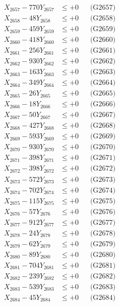 \documentclass[a4paper,10pt]{article}
\begin{document}
{\begin{align}
X_{2657} - 770Y_{2657} &\leq +0 && \text{(G2657)} \\
X_{2658} - 48Y_{2658} &\leq +0 && \text{(G2658)} \\
X_{2659} - 459Y_{2659} &\leq +0 && \text{(G2659)} \\
X_{2660} - 418Y_{2660} &\leq +0 && \text{(G2660)} \\
\allowbreak
X_{2661} - 256Y_{2661} &\leq +0 && \text{(G2661)} \\
X_{2662} - 930Y_{2662} &\leq +0 && \text{(G2662)} \\
X_{2663} - 163Y_{2663} &\leq +0 && \text{(G2663)} \\
X_{2664} - 349Y_{2664} &\leq +0 && \text{(G2664)} \\
X_{2665} - 26Y_{2665} &\leq +0 && \text{(G2665)} \\
X_{2666} - 18Y_{2666} &\leq +0 && \text{(G2666)} \\
X_{2667} - 50Y_{2667} &\leq +0 && \text{(G2667)} \\
X_{2668} - 427Y_{2668} &\leq +0 && \text{(G2668)} \\
X_{2669} - 593Y_{2669} &\leq +0 && \text{(G2669)} \\
X_{2670} - 930Y_{2670} &\leq +0 && \text{(G2670)} \\
\allowbreak
X_{2671} - 398Y_{2671} &\leq +0 && \text{(G2671)} \\
X_{2672} - 398Y_{2672} &\leq +0 && \text{(G2672)} \\
X_{2673} - 572Y_{2673} &\leq +0 && \text{(G2673)} \\
X_{2674} - 702Y_{2674} &\leq +0 && \text{(G2674)} \\
X_{2675} - 115Y_{2675} &\leq +0 && \text{(G2675)} \\
X_{2676} - 57Y_{2676} &\leq +0 && \text{(G2676)} \\
X_{2677} - 912Y_{2677} &\leq +0 && \text{(G2677)} \\
X_{2678} - 24Y_{2678} &\leq +0 && \text{(G2678)} \\
X_{2679} - 62Y_{2679} &\leq +0 && \text{(G2679)} \\
X_{2680} - 89Y_{2680} &\leq +0 && \text{(G2680)} \\
\allowbreak
X_{2681} - 704Y_{2681} &\leq +0 && \text{(G2681)} \\
X_{2682} - 239Y_{2682} &\leq +0 && \text{(G2682)} \\
X_{2683} - 539Y_{2683} &\leq +0 && \text{(G2683)} \\
X_{2684} - 45Y_{2684} &\leq +0 && \text{(G2684)} \\

\end{align}}
\end{document}

